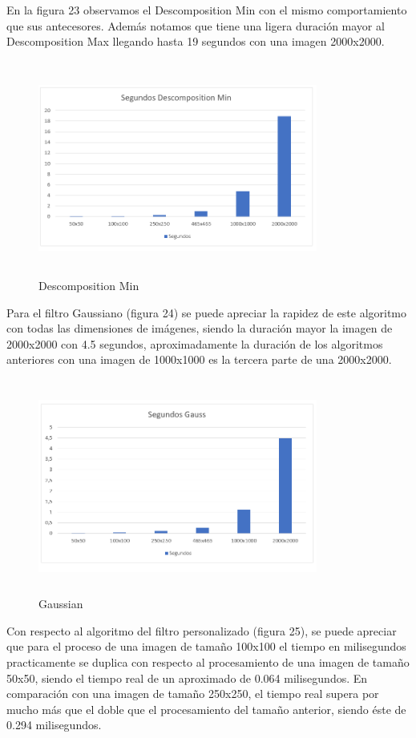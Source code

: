 \documentclass[journal]{IEEEtran}
\begin{document}
\begin{itemize}
	En la figura 23 observamos el Descomposition Min con el mismo comportamiento que sus antecesores. Además notamos que tiene una ligera duración mayor al Descomposition Max llegando hasta 19 segundos con una imagen 2000x2000. 
\newpage
	\begin{figure}[h]
		\centering
		\includegraphics[height= 200pt, width=260pt]{msdmin.png}
		\caption{Descomposition Min}
	\end{figure}

	Para el filtro Gaussiano (figura 24) se puede apreciar la rapidez de este algoritmo con todas las dimensiones de imágenes, siendo la duración mayor la imagen de 2000x2000 con 4.5 segundos, aproximadamente la duración de los algoritmos anteriores con una imagen de 1000x1000 es la tercera parte de una 2000x2000.  

	\begin{figure}[h]
		\centering
		\includegraphics[height= 200pt, width=260pt]{msgauss.png}
		\caption{Gaussian}
	\end{figure}

	Con respecto al algoritmo del filtro personalizado (figura 25), se puede apreciar que para el proceso de una imagen de tamaño 100x100 el tiempo en milisegundos practicamente se duplica con respecto al procesamiento de una imagen de tamaño 50x50, siendo el tiempo real de un aproximado de 0.064 milisegundos. En comparación con una imagen de tamaño 250x250, el tiempo real supera por mucho más que el doble que el procesamiento del tamaño anterior, siendo éste de 0.294 milisegundos.


\end{itemize}
\end{document}
